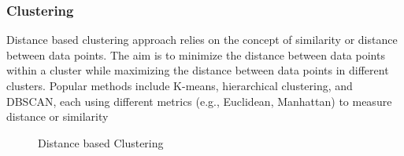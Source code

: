 \documentclass[xcolor=svgnames]{beamer}
\begin{document}
\begin{frame}\frametitle{Clustering}

  Distance based clustering approach relies on the concept of similarity or distance between data points. The aim is to minimize the distance between data points within a cluster while maximizing the distance between data points in different clusters. Popular methods include K-means, hierarchical clustering, and DBSCAN, each using different metrics (e.g., Euclidean, Manhattan) to measure distance or similarity

  \begin{figure}
    \centering
    \caption{Distance based Clustering~\cite{aaron2023explain}}
  \end{figure}



\end{frame}
\end{document}
